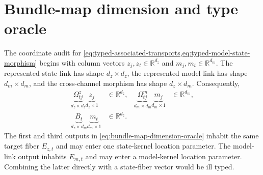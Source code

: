 \section{Bundle-map dimension and type oracle}

The coordinate audit for \cref{eq:typed-associated-transports,eq:typed-model-state-morphism} begins with column vectors $z_j,z_t\in\mathbb R^{d_z}$ and $m_j,m_t\in\mathbb R^{d_m}$.  The represented state link has shape $d_z\times d_z$, the represented model link has shape $d_m\times d_m$, and the cross-channel morphism has shape $d_z\times d_m$.  Consequently,
\begin{equation}
\begin{aligned}
\underbrace{\Omega^z_{tj}}_{d_z\times d_z}
\underbrace{z_j}_{d_z\times 1}
&\in\mathbb R^{d_z},
&
\underbrace{\Omega^m_{tj}}_{d_m\times d_m}
\underbrace{m_j}_{d_m\times 1}
&\in\mathbb R^{d_m},\\
\underbrace{B_t}_{d_z\times d_m}
\underbrace{m_t}_{d_m\times 1}
&\in\mathbb R^{d_z}.
&&
\end{aligned}
\label{eq:bundle-map-dimension-oracle}
\end{equation}
The first and third outputs in \cref{eq:bundle-map-dimension-oracle} inhabit the same target fiber $E_{z,t}$ and may enter one state-kernel location parameter.  The model-link output inhabits $E_{m,t}$ and may enter a model-kernel location parameter.  Combining the latter directly with a state-fiber vector would be ill typed.

